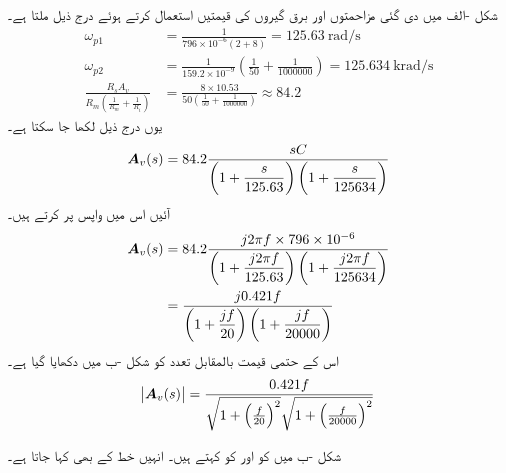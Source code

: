 شکل -الف میں دی گئی مزاحمتوں اور برق گیروں کی قیمتیں استعمال کرتے ہوئے درج ذیل ملتا ہے۔
\begin{align*}
\omega_{p1}&=\frac{1}{796\times 10^{-6}(2+8)}=\SI{125.63}{\radian\per\second}\\
\omega_{p2}&=\frac{1}{159.2\times 10^{-9}}\left(\frac{1}{50}+\frac{1}{1000000}\right)=\SI{125.634}{\kilo\radian\per\second}\\
\frac{R_s A_v}{R_m\left(\frac{1}{R_m}+\frac{1}{R_i}\right)}&=\frac{8 \times 10.53}{50\left(\frac{1}{50}+\frac{1}{1000000}\right)}\approx 84.2
\end{align*}
یوں درج ذیل لکھا جا سکتا ہے۔
\begin{align}\label{مساوت_تعددی_تبادلی_تفاعل_ایمپلیفائر}
{\ensuremath{{\boldsymbol{A}}}}_v(s)= 84.2 \dfrac{sC}{\left(1+\dfrac{s}{125.63}\right)\left(1+\dfrac{s}{125634}\right)}
\end{align}
آئیں اس میں واپس  پر کرتے ہیں۔
\begin{gather}
\begin{aligned}\label{مساوت_تعددی_انقطاعی_تعدد}
{\ensuremath{{\boldsymbol{A}}}}_v(s)&= 84.2 \dfrac{j 2 \pi f \times 796\times 10^{-6}}{\left(1+\dfrac{j 2\pi f}{125.63}\right)\left(1+\dfrac{j 2 \pi f}{125634}\right)}\\
&= \dfrac{j 0.421f}{\left(1+\dfrac{j f}{20}\right)\left(1+\dfrac{j f}{20000}\right)}\\
\end{aligned}
\end{gather}
اس کے حتمی قیمت  بالمقابل تعدد  کو شکل -ب میں دکھایا گیا ہے۔
\begin{align*}
\abs{{{\boldsymbol{A}}}_v(s)}=\frac{0.421 f }{\sqrt{1+\left(\frac{f}{20}\right)^2}\sqrt{1+\left(\frac{f}{20000}\right)^2}}
\end{align*}

شکل -ب میں  کو  اور  کو  کہتے ہیں۔ انہیں خط کے  بھی کہا جاتا ہے۔

